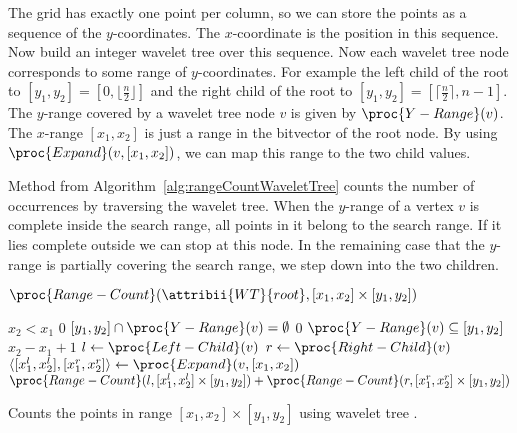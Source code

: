 \begin{Proof}
  The grid has exactly one point per column, so we can store the points as a sequence of the $y$-coordinates. The $x$-coordinate is the position in this sequence. Now build an integer wavelet tree  over this sequence. Now each wavelet tree node corresponds to some range of $y$-coordinates. For example the left child of the root to $[y_1, y_2] = [0, \lfloor\frac{n}{2}\rfloor]$ and the right child of the root to $[y_1, y_2] = [\lceil\frac{n}{2}\rceil, n-1]$. The $y$-range covered by a wavelet tree node $v$ is given by $\proc{Y-Range}(v)$. The $x$-range $[x_1, x_2]$ is just a range in the bitvector of the root node. By using $\proc{Expand}(v, [x_1, x_2])$, we can map this range to the two child values.

  Method  from Algorithm~\ref{alg:rangeCountWaveletTree} counts the number of occurrences by traversing the wavelet tree. When the $y$-range of a vertex $v$ is complete inside the search range, all points in it belong to the search range. If it lies complete outside we can stop at this node. In the remaining case that the $y$-range is partially covering the search range, we step down into the two children.

  \begin{algorithm}[htb]
    \begin{codebox}
      \li \Return $\proc{Range-Count}(\attribii{WT}{root}, [x_1, x_2] \times [y_1, y_2])$
    \end{codebox}
    \vspace{1mm}
    \begin{codebox}
      \li \If $x_2 < x_1$
          \Then
      \li   \Return $0$
          \End
      \li \If $[y_1, y_2] \cap \proc{Y-Range}(v) = \emptyset$
          \Then
      \li   \Return $0$
          \End
      \li \If $\proc{Y-Range}(v) \subseteq [y_1, y_2]$
          \Then
      \li   \Return $x_2 - x_1 + 1$\label{line:wholeRangeCovered}
          \End
      \li $l \gets \proc{Left-Child}(v)$
      \li $r \gets \proc{Right-Child}(v)$
      \li $\langle [x_1^l, x_2^l], [x_1^r, x_2^r] \rangle \gets \proc{Expand}(v, [x_1, x_2])$
      \li \Return $\proc{Range-Count}(l, [x_1^l, x_2^l] \times [y_1, y_2]) + \proc{Range-Count}(r, [x_1^r, x_2^r] \times [y_1, y_2])$
    \end{codebox}
    \caption{Counts the points in range $[x_1, x_2] \times [y_1, y_2]$ using wavelet tree .}
    \label{alg:rangeCountWaveletTree}
  \end{algorithm}


\end{Proof}
